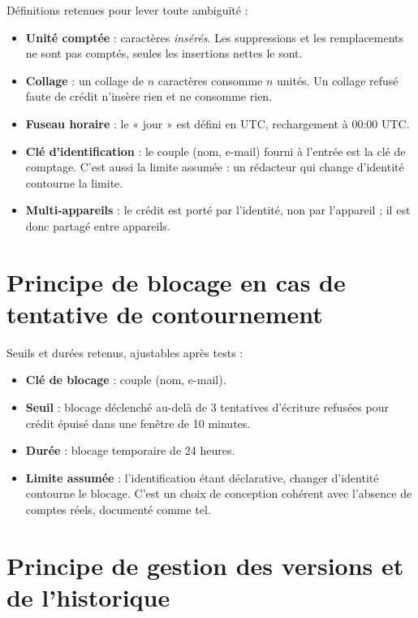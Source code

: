 \begin{hypothesisbox}
Définitions retenues pour lever toute ambiguïté :
\begin{itemize}
    \item \textbf{Unité comptée} : caractères \emph{insérés}. Les suppressions et les remplacements ne sont pas comptés, seules les insertions nettes le sont.
    \item \textbf{Collage} : un collage de $n$ caractères consomme $n$ unités. Un collage refusé faute de crédit n'insère rien et ne consomme rien.
    \item \textbf{Fuseau horaire} : le « jour » est défini en UTC, rechargement à 00:00 UTC.
    \item \textbf{Clé d'identification} : le couple (nom, e-mail) fourni à l'entrée est la clé de comptage. C'est aussi la limite assumée : un rédacteur qui change d'identité contourne la limite.
    \item \textbf{Multi-appareils} : le crédit est porté par l'identité, non par l'appareil ; il est donc partagé entre appareils.
\end{itemize}
\end{hypothesisbox}

\section{Principe de blocage en cas de tentative de contournement}

\begin{hypothesisbox}
Seuils et durées retenus, ajustables après tests :
\begin{itemize}
    \item \textbf{Clé de blocage} : couple (nom, e-mail).
    \item \textbf{Seuil} : blocage déclenché au-delà de 3 tentatives d'écriture refusées pour crédit épuisé dans une fenêtre de 10 minutes.
    \item \textbf{Durée} : blocage temporaire de 24 heures.
    \item \textbf{Limite assumée} : l'identification étant déclarative, changer d'identité contourne le blocage. C'est un choix de conception cohérent avec l'absence de comptes réels, documenté comme tel.
\end{itemize}
\end{hypothesisbox}

\section{Principe de gestion des versions et de l'historique}

